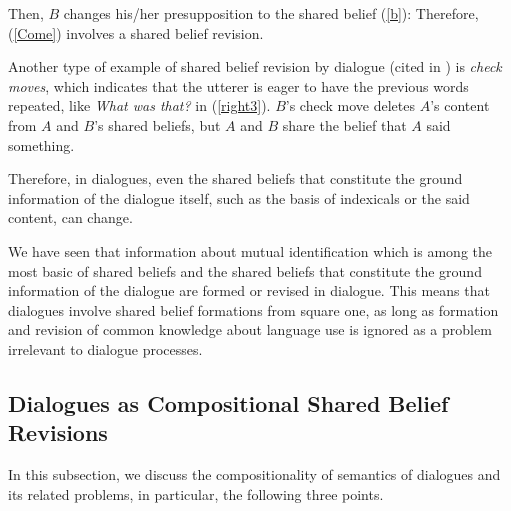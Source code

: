Then, $B$ changes his/her presupposition to the shared belief (\ref{b}):
Therefore, (\ref{Come}) involves a shared belief revision.
\par
Another type of example of shared belief revision by dialogue (cited in \cite{Ste94}) is {\it check moves}, which indicates that the utterer is eager to have the previous words repeated, like {\it What was that?} in (\ref{right3}).
$B$'s check move deletes $A$'s content from $A$ and $B$'s shared beliefs, but $A$ and $B$ share the belief that $A$ said something.
\par
Therefore, in dialogues, even the shared beliefs that constitute the ground information of the dialogue itself, such as the basis of indexicals or the said content, can change.
\par
We have seen that information about mutual identification which is among the most basic of shared beliefs and the shared beliefs that constitute the ground information of the dialogue are formed or revised in dialogue.
This means that dialogues involve shared belief formations from square one, as long as formation and revision of common knowledge about language use is ignored as a problem irrelevant to dialogue processes.
\subsection{Dialogues as Compositional Shared Belief Revisions}\label{comp2}
In this subsection, we discuss the compositionality of semantics of dialogues and its related problems, in particular, the following three points.
\clearpage
